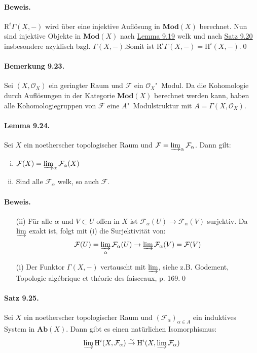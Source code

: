 \paragraph{Beweis.} $\mathrm{R}^i\Gamma(X,-)$ wird über eine injektive Auflösung in $\mathbf{Mod}(X)$ berechnet. Nun sind injektive Objekte in $\mathbf{Mod}(X)$ nach \hyperref[9.19]{Lemma 9.19} welk und nach \hyperref[9.20]{Satz 9.20} insbesondere azyklisch bzgl. $\Gamma(X,-)$.Somit ist $\mathrm{R}^i\Gamma(X,-)=\mathrm{H}^i(X,-)$.\qed

\paragraph{Bemerkung 9.23.}\label{9.23} Sei $(X,\mathcal{O}_X)$ ein geringter Raum und $\mathcal{F}$ ein $\mathcal{O}_X$"~Modul. Da die Kohomologie durch Auflösungen in der Kategorie $\mathbf{Mod}(X)$ berechnet werden kann, haben alle Kohomologiegruppen von $\mathcal{F}$ eine $A$"~Modulstruktur mit $A=\Gamma(X,\mathcal{O}_X)$.

\paragraph{Lemma 9.24.}\label{9.24} Sei $X$ ein noetherscher topologischer Raum und $\mathcal{F}=\varinjlim_\alpha\mathcal{F}_\alpha$. Dann gilt:
\begin{enumerate}[(i)]
\item $\mathcal{F}(X)=\varinjlim_\alpha\mathcal{F}_\alpha(X)$
\item Sind alle $\mathcal{F}_\alpha$ welk, so auch $\mathcal{F}$.
\end{enumerate}

\paragraph{Beweis.}\begin{enumerate}
\item[(ii)] Für alle $\alpha$ und $V\subset U$ offen in $X$ ist $\mathcal{F}_\alpha(U)\to\mathcal{F}_\alpha(V)$ surjektiv. Da $\varinjlim$ exakt ist, folgt mit (i) die Surjektivität von:
\[\mathcal{F}(U)=\varinjlim_\alpha\mathcal{F}_\alpha(U)\to\varinjlim\mathcal{F}_\alpha(V) = \mathcal{F}(V) \]
\item[(i)] Der Funktor $\Gamma(X,-)$ vertauscht mit $\varinjlim$, siehe z.B. Godement, Topologie algébrique et théorie des faisceaux, p. 169.\qed
\end{enumerate}

\paragraph{Satz 9.25.}\label{9.25} Sei $X$ ein noetherscher topologischer Raum und $(\mathcal{F}_\alpha)_{\alpha\in A}$ ein induktives System in $\mathbf{Ab}(X)$. Dann gibt es einen natürlichen Isomorphismus:
\[\varinjlim\mathrm{H}^i(X,\mathcal{F}_\alpha) \stackrel{\sim}{\to} \mathrm{H}^i(X,\varinjlim\mathcal{F}_\alpha) \]

